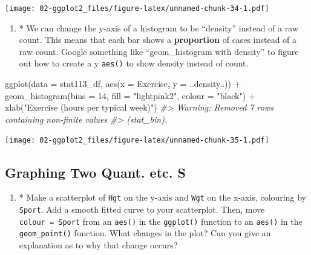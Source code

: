\documentclass[
]{book}
\newenvironment{Shaded}{\begin{snugshade}}{\end{snugshade}}
\newcommand{\AttributeTok}[1]{\textcolor[rgb]{0.77,0.63,0.00}{#1}}
\newcommand{\CommentTok}[1]{\textcolor[rgb]{0.56,0.35,0.01}{\textit{#1}}}
\newcommand{\DecValTok}[1]{\textcolor[rgb]{0.00,0.00,0.81}{#1}}
\newcommand{\FunctionTok}[1]{\textcolor[rgb]{0.00,0.00,0.00}{#1}}
\newcommand{\NormalTok}[1]{#1}
\newcommand{\SpecialCharTok}[1]{\textcolor[rgb]{0.00,0.00,0.00}{#1}}
\newcommand{\StringTok}[1]{\textcolor[rgb]{0.31,0.60,0.02}{#1}}
\providecommand{\tightlist}{%
  \setlength{\itemsep}{0pt}\setlength{\parskip}{0pt}}
\begin{document}
\texttt{[image: 02-ggplot2\_files/figure-latex/unnamed-chunk-34-1.pdf]}

\begin{enumerate}
\def\labelenumi{\arabic{enumi}.}
\setcounter{enumi}{4}
\tightlist
\item
  * We can change the y-axis of a histogram to be ``density'' instead of a raw count. This means that each bar shows a \textbf{proportion} of cases instead of a raw count. Google something like ``geom\_histogram with density'' to figure out how to create a y \texttt{aes()} to show density instead of count.
\end{enumerate}

\begin{Shaded}
\begin{Highlighting}[]
\FunctionTok{ggplot}\NormalTok{(}\AttributeTok{data =}\NormalTok{ stat113\_df, }\FunctionTok{aes}\NormalTok{(}\AttributeTok{x =}\NormalTok{ Exercise, }\AttributeTok{y =}\NormalTok{ ..density..)) }\SpecialCharTok{+}
  \FunctionTok{geom\_histogram}\NormalTok{(}\AttributeTok{bins =} \DecValTok{14}\NormalTok{, }\AttributeTok{fill =} \StringTok{"lightpink2"}\NormalTok{, }\AttributeTok{colour =} \StringTok{"black"}\NormalTok{) }\SpecialCharTok{+}
  \FunctionTok{xlab}\NormalTok{(}\StringTok{"Exercise (hours per typical week)"}\NormalTok{)}
\CommentTok{\#\textgreater{} Warning: Removed 7 rows containing non{-}finite values}
\CommentTok{\#\textgreater{} (stat\_bin).}
\end{Highlighting}
\end{Shaded}

\texttt{[image: 02-ggplot2\_files/figure-latex/unnamed-chunk-35-1.pdf]}

\hypertarget{graphing-two-quant.-etc.-s}{%
\subsection{Graphing Two Quant. etc. S}\label{graphing-two-quant.-etc.-s}}

\begin{enumerate}
\def\labelenumi{\arabic{enumi}.}
\setcounter{enumi}{3}
\tightlist
\item
  * Make a scatterplot of \texttt{Hgt} on the y-axis and \texttt{Wgt} on the x-axis, colouring by \texttt{Sport}. Add a smooth fitted curve to your scatterplot. Then, move \texttt{colour\ =\ Sport} from an \texttt{aes()} in the \texttt{ggplot()} function to an \texttt{aes()} in the \texttt{geom\_point()} function. What changes in the plot? Can you give an explanation as to why that change occurs?
\end{enumerate}
\end{document}

